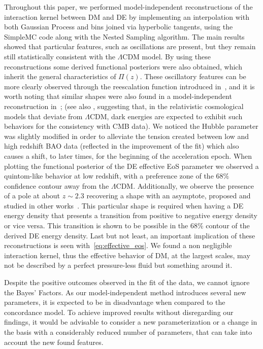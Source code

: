 \documentclass[twocolumn,a4paper,reprint,amssymb,aps,prd,groupedaddress,superscriptaddress,nofootinbib]{revtex4-2}
\begin{document}
Throughout this paper,  we performed model-independent reconstructions of the interaction kernel between
DM and DE by implementing an interpolation with both Gaussian Process and bins joined via hyperbolic tangents,
using the SimpleMC code along with the Nested Sampling algorithm.
The main results showed that particular features, such as oscillations are present, but they remain still
statistically consistent with the $\Lambda$CDM model.
By using these reconstructions some derived functional posteriors were also obtained, which inherit
the general characteristics of $\Pi(z)$.
These oscillatory features can be more clearly observed through the reescalation function introduced in~\cite{Solano:2012zw},
and it is worth noting that similar shapes were also found in a model-independent reconstruction in~\cite{Cai:2009ht};
(see also \cite{Akarsu:2022lhx}, suggesting that, in the relativistic cosmological models that
deviate from $\Lambda$CDM, dark energies are expected to exhibit such behaviors for the consistency with CMB data).
We noticed the Hubble parameter was slightly modified in order to alleviate the tension created between
low and high redshift BAO data (reflected in the improvement of the fit) which also causes a shift, to later times,
for the beginning of the acceleration epoch.
%
When plotting the functional posterior of the DE effective EoS parameter we observed a quintom-like behavior
at low redshift, with a preference zone of the $68\%$ confidence contour away from the $\Lambda$CDM.
%
Additionally, we observe the presence of a pole at about $z\sim 2.3$ recovering a shape with an asymptote,
%
proposed and studied  in other works~\cite{Akarsu:2020pka, Akarsu:2021fol, Escamilla:2021uoj,
gomez2015background, wang2019searching}.
This particular shape is required when having a DE energy density that presents a transition from positive to negative energy density or vice versa.  This transition is shown to be possible in the 68\% contour
of the derived DE energy density.
Last but not least, an important implication of these reconstructions is seen with~\cref{eq:effective_eos}.
We found a non negligible interaction kernel, thus the effective behavior of DM, at the largest scales,
may not be described by a perfect pressure-less fluid but something around it.

%
Despite the positive outcomes observed in the fit of the data, we cannot ignore the Bayes' Factors.
As our model-independent method introduces several new parameters, it is expected to be in
disadvantage when compared to the concordance model.
%
To achieve improved results without disregarding our findings, it would be advisable to consider a
new parameterization or a change in the basis with a considerably reduced number of parameters, that can
take into account the new found features.
\end{document}
